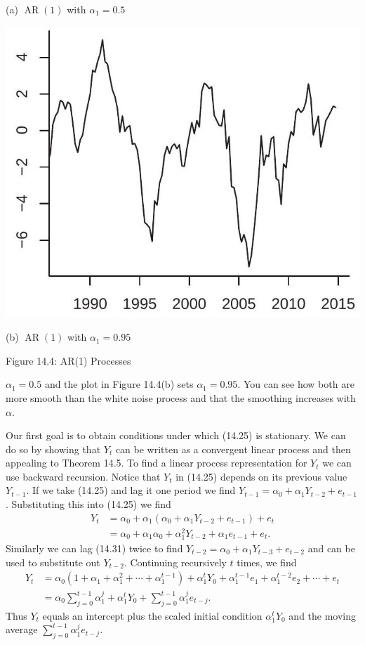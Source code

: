 \documentclass[10pt]{article}
\begin{document}
(a) $\operatorname{AR}(1)$ with $\alpha_{1}=0.5$

\includegraphics[max width=\textwidth]{2022_10_23_6047885e7d154c9f28afg-24(1)}

(b) $\operatorname{AR}(1)$ with $\alpha_{1}=0.95$

Figure 14.4: AR(1) Processes

$\alpha_{1}=0.5$ and the plot in Figure 14.4(b) sets $\alpha_{1}=0.95$. You can see how both are more smooth than the white noise process and that the smoothing increases with $\alpha$.

Our first goal is to obtain conditions under which (14.25) is stationary. We can do so by showing that $Y_{t}$ can be written as a convergent linear process and then appealing to Theorem 14.5. To find a linear process representation for $Y_{t}$ we can use backward recursion. Notice that $Y_{t}$ in (14.25) depends on its previous value $Y_{t-1}$. If we take (14.25) and lag it one period we find $Y_{t-1}=\alpha_{0}+\alpha_{1} Y_{t-2}+e_{t-1}$. Substituting this into (14.25) we find
$$
\begin{aligned}
Y_{t} &=\alpha_{0}+\alpha_{1}\left(\alpha_{0}+\alpha_{1} Y_{t-2}+e_{t-1}\right)+e_{t} \\
&=\alpha_{0}+\alpha_{1} \alpha_{0}+\alpha_{1}^{2} Y_{t-2}+\alpha_{1} e_{t-1}+e_{t} .
\end{aligned}
$$
Similarly we can lag (14.31) twice to find $Y_{t-2}=\alpha_{0}+\alpha_{1} Y_{t-3}+e_{t-2}$ and can be used to substitute out $Y_{t-2}$. Continuing recursively $t$ times, we find
$$
\begin{aligned}
Y_{t} &=\alpha_{0}\left(1+\alpha_{1}+\alpha_{1}^{2}+\cdots+\alpha_{1}^{t-1}\right)+\alpha_{1}^{t} Y_{0}+\alpha_{1}^{t-1} e_{1}+\alpha_{1}^{t-2} e_{2}+\cdots+e_{t} \\
&=\alpha_{0} \sum_{j=0}^{t-1} \alpha_{1}^{j}+\alpha_{1}^{t} Y_{0}+\sum_{j=0}^{t-1} \alpha_{1}^{j} e_{t-j} .
\end{aligned}
$$
Thus $Y_{t}$ equals an intercept plus the scaled initial condition $\alpha_{1}^{t} Y_{0}$ and the moving average $\sum_{j=0}^{t-1} \alpha_{1}^{j} e_{t-j}$.
\end{document}
